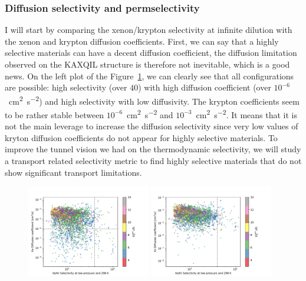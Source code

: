 \documentclass[main]{subfiles}
\begin{document}
\subsubsection{Diffusion selectivity and permselectivity}

I will start by comparing the xenon/krypton selectivity at infinite dilution with the xenon and krypton diffusion coefficients. First, we can say that a highly selective materials can have a decent diffusion coefficient, the diffusion limitation observed on the KAXQIL structure is therefore not inevitable, which is a good news. On the left plot of the Figure~\ref{fgr:diff_s0_lcd}, we can clearly see that all configurations are possible: high selectivity (over $40$) with high diffusion coefficient (over $10^{-6}$~\si{\square\cm\per\square\s}) and high selectivity with low diffusivity. The krypton coefficients seem to be rather stable between $10^{-6}$~\si{\square\cm\per\square\s} and $10^{-3}$~\si{\square\cm\per\square\s}. It means that it is not the main leverage to increase the diffusion selectivity since very low values of kryton diffusion coefficients do not appear for highly selective materials. To improve the tunnel vision we had on the thermodynamic selectivity, we will study a transport related selectivity metric to find highly selective materials that do not show significant transport limitations.

\begin{figure}[ht]
  \centering
    \includegraphics[width=0.48\textwidth]{figures/5-diffusion/D_xe-s0-lcd.pdf}
    \includegraphics[width=0.48\textwidth]{figures/5-diffusion/D_kr-s0-lcd.pdf}
    \caption{}\label{fgr:diff_s0_lcd}
\end{figure}
\end{document}
